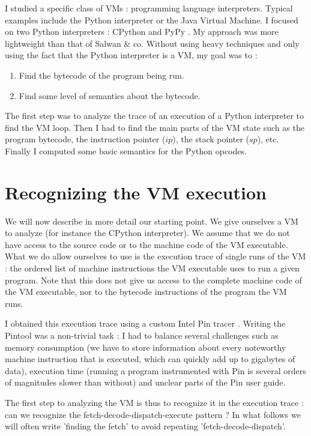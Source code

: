 \documentclass[english]{article}
\begin{document}
I studied a specific class of VMs : programming language interpreters. Typical examples include the Python interpreter or the Java Virtual Machine. I focused on two Python interpreters : CPython \cite{cpython} and PyPy \cite{pypy}. My approach was more lightweight than that of Salwan \& co. Without using heavy techniques and only using the fact that the Python interpreter is a VM, my goal was to :
\begin{enumerate}
	\item Find the bytecode of the program being run.
	\item Find some level of semantics about the bytecode.
\end{enumerate}

The first step was to analyze the trace of an execution of a Python interpreter to find the VM loop. Then I had to find the main parts of the VM state such as the program bytecode, the instruction pointer ($ip$), the stack pointer ($sp$), etc. Finally I computed some basic semantics for the Python opcodes.

\section{Recognizing the VM execution}

We will now describe in more detail our starting point. We give ourselves a VM to analyze (for instance the CPython interpreter). We assume that we do not have access to the source code or to the machine code of the VM executable. What we do allow ourselves to use is the execution trace of single runs of the VM : the ordered list of machine instructions the VM executable uses to run a given program. Note that this does not give us access to the complete machine code of the VM executable, nor to the bytecode instructions of the program the VM runs. 

I obtained this execution trace using a custom Intel Pin tracer \cite{intelpin}. Writing the Pintool was a non-trivial task : I had to balance several challenges such as memory consumption (we have to store information about every noteworthy machine instruction that is executed, which can quickly add up to gigabytes of data), execution time (running a program instrumented with Pin is several orders of magnitudes slower than without) and unclear parts of the Pin user guide.

The first step to analyzing the VM is thus to recognize it in the execution trace : can we recognize the fetch-decode-dispatch-execute pattern ? In what follows we will often write 'finding the fetch' to avoid repeating 'fetch-decode-dispatch'.
\end{document}
